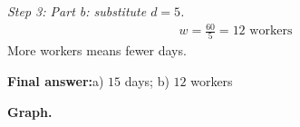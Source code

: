 \documentclass[11pt]{article}
\begin{document}
\textit{Step 3: Part b: substitute \( d = 5 \).}
\[\begin{gathered}
w = \frac{60}{5} = 12 \text{ workers}
\end{gathered}\]
More workers means fewer days.

\begin{answerbox}
\textbf{Final answer:}\quad a) \(\displaystyle 15\) days; b) \(\displaystyle 12\) workers
\end{answerbox}
\textbf{Graph.}

\begin{center}
\end{center}
\end{document}
